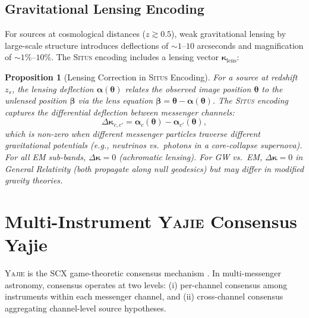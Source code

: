 \documentclass[11pt,a4paper]{article}
\newtheorem{proposition}[theorem]{Proposition}
\theoremstyle{definition}
\newcommand{\Situs}{\textsc{Situs}}
\newcommand{\Yajie}{\textsc{Yajie}}
\newcommand{\SCX}{\textsc{SCX}}
\begin{document}
\subsection{Gravitational Lensing Encoding}
For sources at cosmological distances ($z \gtrsim 0.5$), weak gravitational lensing by large-scale structure introduces deflections of $\sim 1$--$10$ arcseconds and magnification of $\sim 1\%$--$10\%$. The \Situs{} encoding includes a lensing vector $\boldsymbol{\kappa}_{\mathrm{lens}}$:
\begin{proposition}[Lensing Correction in \Situs{} Encoding]\label{prop:lensing_situs}
For a source at redshift $z_s$, the lensing deflection $\boldsymbol{\alpha}(\boldsymbol{\theta})$ relates the observed image position $\boldsymbol{\theta}$ to the unlensed position $\boldsymbol{\beta}$ via the lens equation $\boldsymbol{\beta} = \boldsymbol{\theta} - \boldsymbol{\alpha}(\boldsymbol{\theta})$. The \Situs{} encoding captures the differential deflection between messenger channels:
\begin{equation}\label{eq:lensing_differential}
\Delta \boldsymbol{\kappa}_{c, c'} = \boldsymbol{\alpha}_c(\boldsymbol{\theta}) - \boldsymbol{\alpha}_{c'}(\boldsymbol{\theta}),
\end{equation}
which is non-zero when different messenger particles traverse different gravitational potentials (e.g., neutrinos vs.\ photons in a core-collapse supernova). For all EM sub-bands, $\Delta \boldsymbol{\kappa} = 0$ (achromatic lensing). For GW vs.\ EM, $\Delta \boldsymbol{\kappa} = 0$ in General Relativity (both propagate along null geodesics) but may differ in modified gravity theories.
\end{proposition}
\section{Multi-Instrument \Yajie{} Consensus Yajie}
\label{sec:yajie}
\Yajie{} is the \SCX{} game-theoretic consensus mechanism \cite{SCX2025}. In multi-messenger astronomy, consensus operates at two levels: (i) per-channel consensus among instruments within each messenger channel, and (ii) cross-channel consensus aggregating channel-level source hypotheses.
\end{document}
